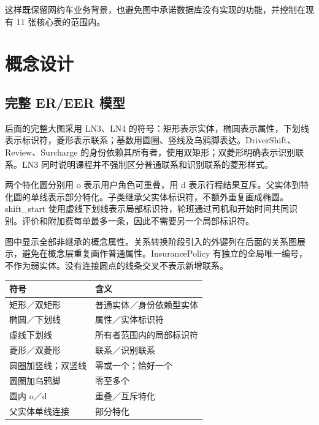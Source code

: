 \documentclass[11pt,a4paper]{article}
\begin{document}
这样既保留网约车业务背景，也避免图中承诺数据库没有实现的功能，并控制在现有 11 张核心表的范围内。

\clearpage

\clearpage


\clearpage
\section{概念设计}
\subsection{完整 ER/EER 模型}
后面的完整大图采用 LN3、LN4 的符号：矩形表示实体，椭圆表示属性，下划线表示标识符，菱形表示联系；基数用圆圈、竖线及乌鸦脚表达。DriverShift、Review、Surcharge 的身份依赖其所有者，使用双矩形；双菱形明确表示识别联系。LN3 同时说明课程并不强制区分普通联系和识别联系的菱形样式。

两个特化圆分别用 o 表示用户角色可重叠，用 d 表示行程结果互斥。父实体到特化圆的单线表示部分特化。子类继承父实体标识符，不额外重复画成椭圆。shift\_\allowbreak{}start 使用虚线下划线表示局部标识符，轮班通过司机和开始时间共同识别。评价和附加费每单最多一条，因此不需要另一个局部标识符。

图中显示全部非继承的概念属性。关系转换阶段引入的外键列在后面的关系图展示，避免在概念层重复画作普通属性。InsurancePolicy 有独立的全局唯一编号，不作为弱实体。没有连接圆点的线条交叉不表示新增联系。

\par\begingroup\small\noindent
\begin{tabularx}{\linewidth}{YY}
\toprule
符号 & 含义\\\midrule
矩形／双矩形 & 普通实体／身份依赖型实体\\
椭圆／下划线 & 属性／实体标识符\\
虚线下划线 & 所有者范围内的局部标识符\\
菱形／双菱形 & 联系／识别联系\\
圆圈加竖线；双竖线 & 零或一个；恰好一个\\
圆圈加乌鸦脚 & 零至多个\\
圆内 o／d & 重叠／互斥特化\\
父实体单线连接 & 部分特化\\
\bottomrule
\end{tabularx}
\par\endgroup
\clearpage

\end{document}
